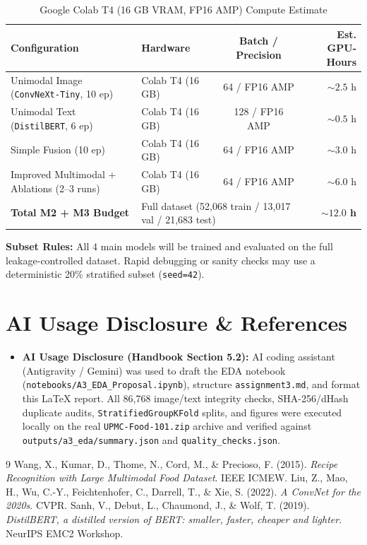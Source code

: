 \documentclass[twoside,final]{hcmut-report}
\begin{document}
\begin{table}[H]
\centering
\caption{Google Colab T4 (16 GB VRAM, FP16 AMP) Compute Estimate}
\begin{tabularx}{\linewidth}{X l c r}
\toprule
\textbf{Configuration} & \textbf{Hardware} & \textbf{Batch / Precision} & \textbf{Est. GPU-Hours} \\
\midrule
Unimodal Image (\texttt{ConvNeXt-Tiny}, 10 ep) & Colab T4 (16 GB) & 64 / FP16 AMP & $\sim 2.5$ h \\
Unimodal Text (\texttt{DistilBERT}, 6 ep) & Colab T4 (16 GB) & 128 / FP16 AMP & $\sim 0.5$ h \\
Simple Fusion (10 ep) & Colab T4 (16 GB) & 64 / FP16 AMP & $\sim 3.0$ h \\
Improved Multimodal + Ablations (2--3 runs) & Colab T4 (16 GB) & 64 / FP16 AMP & $\sim 6.0$ h \\
\midrule
\textbf{Total M2 + M3 Budget} & \multicolumn{2}{l}{Full dataset (52,068 train / 13,017 val / 21,683 test)} & \textbf{$\sim 12.0$ h} \\
\bottomrule
\end{tabularx}
\end{table}

\noindent\textbf{Subset Rules:} All 4 main models will be trained and evaluated on the full leakage-controlled dataset. Rapid debugging or sanity checks may use a deterministic 20\% stratified subset (\texttt{seed=42}).

\section{AI Usage Disclosure \& References}

\begin{itemize}
    \item \textbf{AI Usage Disclosure (Handbook Section 5.2):} AI coding assistant (Antigravity / Gemini) was used to draft the EDA notebook (\texttt{notebooks/A3\_EDA\_Proposal.ipynb}), structure \texttt{assignment3.md}, and format this LaTeX report. All 86,768 image/text integrity checks, SHA-256/dHash duplicate audits, \texttt{StratifiedGroupKFold} splits, and figures were executed locally on the real \texttt{UPMC-Food-101.zip} archive and verified against \texttt{outputs/a3\_eda/summary.json} and \texttt{quality\_checks.json}.
\end{itemize}

\begin{thebibliography}{9}
 Wang, X., Kumar, D., Thome, N., Cord, M., \& Precioso, F. (2015). \emph{Recipe Recognition with Large Multimodal Food Dataset}. IEEE ICMEW.
 Liu, Z., Mao, H., Wu, C.-Y., Feichtenhofer, C., Darrell, T., \& Xie, S. (2022). \emph{A ConvNet for the 2020s}. CVPR.
 Sanh, V., Debut, L., Chaumond, J., \& Wolf, T. (2019). \emph{DistilBERT, a distilled version of BERT: smaller, faster, cheaper and lighter}. NeurIPS EMC2 Workshop.
\end{thebibliography}
\end{document}

